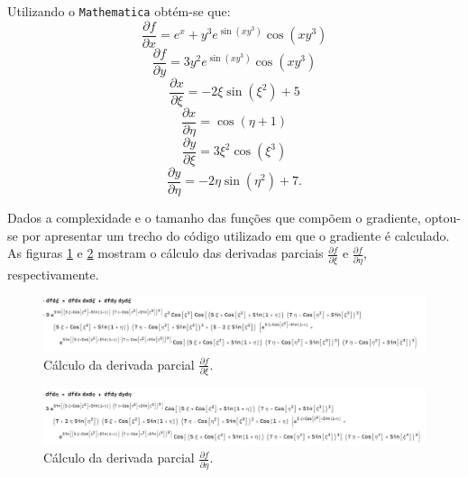 Utilizando o \texttt{Mathematica} obt\'em-se que: 
\begin{equation*}
    \frac{\partial f}{\partial x} = e^x + y^3 e^{\sin \left(x
    y^3\right)} \cos \left(x
    y^3\right)
\end{equation*}
\begin{equation*}
    \frac{\partial f}{\partial y} = 3 y^2 e^{\sin \left(x
    y^3\right)} \cos \left(x
    y^3\right)
\end{equation*}
\begin{equation*}
    \frac{\partial x}{\partial \xi} = -2 \xi \sin \left(\xi^2\right) + 5
\end{equation*}
\begin{equation*}
    \frac{\partial x}{\partial \eta} = \cos \left(\eta + 1\right)
\end{equation*}
\begin{equation*}
    \frac{\partial y}{\partial \xi} = 3 \xi^2 \cos \left(\xi^3\right)
\end{equation*}
\begin{equation*}
    \frac{\partial y}{\partial \eta} = -2 \eta \sin \left(\eta^2\right) + 7.
\end{equation*}

Dados a complexidade e o tamanho das fun\c{c}\~oes que comp\~oem o gradiente, optou-se por apresentar um trecho do c\'odigo utilizado em que o gradiente \'e calculado. As figuras \ref{fig:dfdxi} e \ref{fig:dfdeta} mostram o c\'alculo das derivadas parciais $\frac{\partial f}{\partial \xi}$ e $\frac{\partial f}{\partial \eta}$, respectivamente.

\begin{figure}[H]
    \centering
    \includegraphics[scale=.38]{Figures/Ex3dfdxi.jpeg}
    \caption{C\'alculo da derivada parcial $\frac{\partial f}{\partial \xi}$.}
    \label{fig:dfdxi}
\end{figure}

\begin{figure}[H]
    \centering
    \includegraphics[scale=.38]{Figures/Ex3dfdeta.jpeg}
    \caption{C\'alculo da derivada parcial $\frac{\partial f}{\partial \eta}$.}
    \label{fig:dfdeta}
\end{figure}

